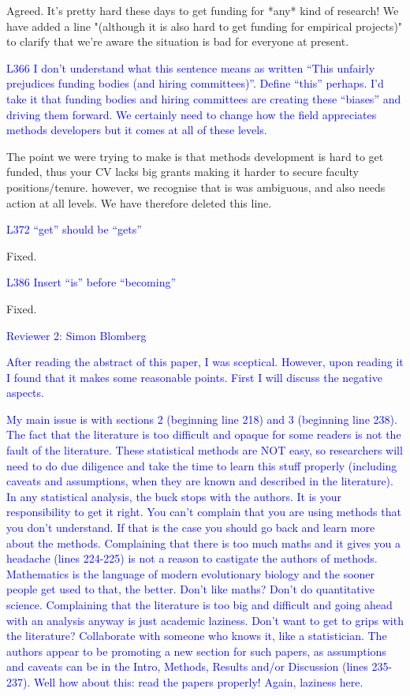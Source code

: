 \documentclass[12pt]{letter}
\begin{document}
\begin{letter}{}
Agreed. It's pretty hard these days to get funding for *any* kind of research! We have added a line "(although it is also hard to get funding for empirical projects)" to clarify that we're aware the situation is bad for everyone at present.

\textcolor{blue}{L366 I don't understand what this sentence means as written “This unfairly prejudices funding bodies (and hiring committees)”. Define “this” perhaps. I'd take it that funding bodies and hiring committees are creating these “biases” and driving them forward. We certainly need to change how the field appreciates methods developers but it comes at all of these levels.}

The point we were trying to make is that methods development is hard to get funded, thus your CV lacks big grants making it harder to secure faculty positions/tenure. however, we recognise that is was ambiguous, and also needs action at all levels. We have therefore deleted this line.

\textcolor{blue}{L372 “get” should be “gets”}

Fixed.

\textcolor{blue}{L386 Insert “is” before “becoming”}

Fixed. 

\textcolor{blue}{Reviewer 2: Simon Blomberg}

\textcolor{blue}{After reading the abstract of this paper, I was sceptical. However, upon reading it I found that it makes some reasonable points. First I will discuss the negative aspects.}

\textcolor{blue}{My main issue is with sections 2 (beginning line 218) and 3 (beginning line 238). The fact that the literature is too difficult and opaque for some readers is not the fault of the literature. These statistical methods are NOT easy, so researchers will need to do due diligence and take the time to learn this stuff properly (including caveats and assumptions, when they are known and described in the literature). In any statistical analysis, the buck stops with the authors. It is your responsibility to get it right. You can't complain that you are using methods that you don't understand. If that is the case you should go back and learn more about the methods. Complaining that there is too much maths and it gives you a headache (lines 224-225) is not a reason to castigate the authors of methods. Mathematics is the language of modern evolutionary biology and the sooner people get used to that, the better. Don't like maths? Don't do quantitative science. Complaining that the literature is too big and difficult and going ahead with an analysis anyway is just academic laziness. Don't want to get to grips with the literature? Collaborate with someone who knows it, like a statistician. The authors appear to be promoting a new section for such papers, as assumptions and caveats can be in the Intro, Methods, Results and/or Discussion (lines 235-237). Well how about this: read the papers properly! Again, laziness here.}


\end{letter}
\end{document}
